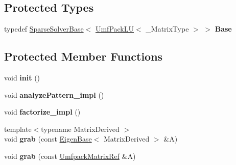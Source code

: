 \subsection*{Protected Types}
\begin{DoxyCompactItemize}
\item 
\mbox{\label{class_eigen_1_1_umf_pack_l_u_af627be039e9d4054480287e2a79dd860}} 
typedef \mbox{\hyperlink{class_eigen_1_1_sparse_solver_base}{Sparse\+Solver\+Base}}$<$ \mbox{\hyperlink{class_eigen_1_1_umf_pack_l_u}{Umf\+Pack\+LU}}$<$ \+\_\+\+Matrix\+Type $>$ $>$ {\bfseries Base}
\end{DoxyCompactItemize}
\subsection*{Protected Member Functions}
\begin{DoxyCompactItemize}
\item 
\mbox{\label{class_eigen_1_1_umf_pack_l_u_a5a5adf4464c78eb83aafa7cbf9ad39cf}} 
void {\bfseries init} ()
\item 
\mbox{\label{class_eigen_1_1_umf_pack_l_u_a9d319cce61d8797d1f0ba6b6ae3087c9}} 
void {\bfseries analyze\+Pattern\+\_\+impl} ()
\item 
\mbox{\label{class_eigen_1_1_umf_pack_l_u_a23ec2a84911a59ee4295d309d975a3d5}} 
void {\bfseries factorize\+\_\+impl} ()
\item 
\mbox{\label{class_eigen_1_1_umf_pack_l_u_a1b47abf8be308bbd60c37f3a0940fc43}} 
{\footnotesize template$<$typename Matrix\+Derived $>$ }\\void {\bfseries grab} (const \mbox{\hyperlink{struct_eigen_1_1_eigen_base}{Eigen\+Base}}$<$ Matrix\+Derived $>$ \&A)
\item 
\mbox{\label{class_eigen_1_1_umf_pack_l_u_ac17fdc73306848870023e90bd3da8b70}} 
void {\bfseries grab} (const \mbox{\hyperlink{class_eigen_1_1_ref}{Umfpack\+Matrix\+Ref}} \&A)
\end{DoxyCompactItemize}

